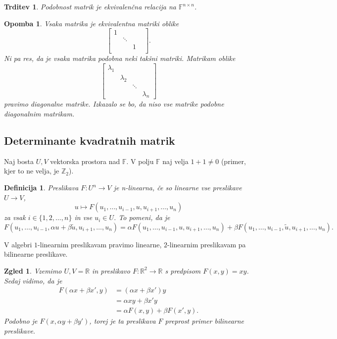 \documentclass[10pt, a4paper]{article}
\newtheorem{trditev}[izr]{Trditev}
\newtheorem{defi}{Definicija}[section]
\newenvironment{noticeB}{%
  \tcolorbox[%
  notitle,
  empty,
  enhanced,  %
  breakable,
  coltext=black,
  colback=white, 
  fontupper=\rmfamily,
  parbox=false,
  noparskip,
  sharp corners,
  boxrule=-1pt,  %
  frame hidden,
  left=7pt,  %
  right=7pt,
  top=5pt,
  bottom=5pt,
  before skip=2.5ex plus 2pt,
  after skip=2.5ex plus 2pt,
  borderline west = {1.5pt}{-0.1pt}{blue!30!black}, %
  overlay unbroken and last={%
    \draw[color=black, line width=1.25pt]
    ($(frame.south west)+(1.pt, -0.1pt)$) -- ++(2em, 0);
  }
  ]}
{\endtcolorbox}
\newenvironment{definicija}{\begin{defi}\begin{noticeB}}{%
    \end{noticeB}\end{defi}}
\newtheorem*{opomba}{Opomba}
\newtheorem{zgled}{Zgled}[section]
\newcommand{\Z}{\mathbb {Z}}
\newcommand{\R}{\mathbb {R}}
\newcommand{\F}{\mathbb {F}}
\begin{document}
\begin{trditev}
    Podobnost matrik je ekvivalenčna relacija na $\F^{n \times n}$.
\end{trditev}

\begin{opomba}
    Vsaka matrika je ekvivalentna matriki oblike
    $$\begin{bmatrix}
        1 & & & \\
        & \ddots & & \\
        & & 1 & \\
        & & &
    \end{bmatrix}.$$
    Ni pa res, da je vsaka matrika podobna neki takšni matriki.
    Matrikam oblike
    $$\begin{bmatrix}
        \lambda_1 & & & \\
        & \lambda_2 & & \\
        & & \ddots & \\
        & & & \lambda_n
    \end{bmatrix}$$ pravimo diagonalne matrike.
    Izkazalo se bo, da niso vse matrike podobne diagonalnim matrikam.
\end{opomba}

\subsection{Determinante kvadratnih matrik}

Naj bosta $U,V$ vektorska prostora nad $\F$. V polju $\F$ naj velja $1 + 1 \neq 0$ (primer, kjer to ne velja, je $\Z_2$).

\begin{definicija}
    Preslikava $F : U^n \rightarrow V$ je n-linearna, če so linearne vse preslikave
    $U \rightarrow V$,
    $$u \mapsto F(u_1, \dots, u_{i-1}, u, u_{i+1},\dots, u_n)$$
    za vsak $i \in \{1, 2, \dots, n\}$ in vse $u_i \in U$.
    To pomeni, da je
    $F(u_1, \dots, u_{i-1}, \alpha u + \beta \tilde{u}, u_{i+1}, \dots, u_n) = \alpha F(u_1, \dots, u_{i-1}, u, u_{i+1},\dots, u_n) + \beta F(u_1, \dots, u_{i-1}, \tilde{u}, u_{i+1},\dots, u_n).$
\end{definicija}

V algebri $1$-linearnim preslikavam pravimo linearne, $2$-linearnim preslikavam pa bilinearne preslikave.

\begin{zgled}
    Vzemimo $U, V = \R$ in preslikavo $F: \R^2 \rightarrow \R$ s predpisom $F(x, y) = xy$.
    Sedaj vidimo, da je
    \begin{align*}
        F(\alpha x + \beta x', y) &= (\alpha x + \beta x') y\\
        &= \alpha xy + \beta x' y\\
        &= \alpha F(x, y) + \beta F(x', y).
    \end{align*}
    Podobno je $F(x, \alpha y + \beta y')$, torej je ta preslikava $F$ preprost primer bilinearne preslikave.
\end{zgled}
\end{document}
